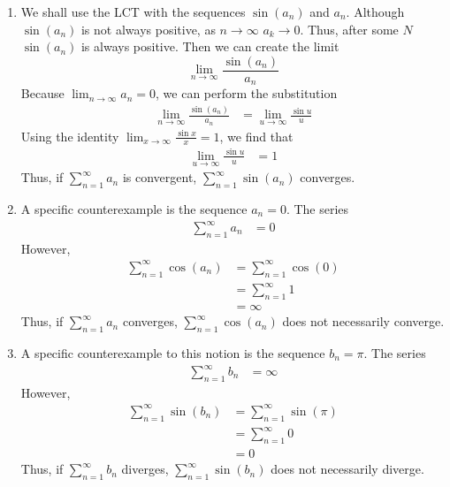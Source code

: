 \documentclass{article}
\begin{document}
\begin{enumerate}[label=\textbf{(11.\arabic*)}]
\begin{enumerate}
    \item We shall use the LCT with the sequences $\sin(a_n)$ and $a_n$. Although $\sin(a_n)$ is not always positive, as $n\to\infty$ $a_k\to0$. Thus, after some $N$ $\sin(a_n)$ is always positive. Then we can create the limit
    \[\lim_{n\to\infty}\frac{\sin(a_n)}{a_n}\]
    Because $\displaystyle \lim_{n\to\infty} a_n=0$, we can perform the substitution
    \begin{align*}
        \lim_{n\to\infty}\frac{\sin(a_n)}{a_n} &= \lim_{u\to\infty} \frac{\sin u}{u}
    \end{align*}
    Using the identity $\displaystyle \lim_{x\to\infty} \frac{\sin x}{x}=1$, we find that
    \begin{align*}
        \lim_{u\to\infty} \frac{\sin u}{u} &= 1
    \end{align*}
    Thus, if $\displaystyle \sum_{n=1}^\infty a_n$ is convergent, $\displaystyle \sum_{n=1}^\infty \sin(a_n)$ converges.
    \item A specific counterexample is the sequence $a_n=0$. The series 
    \begin{align*}
        \sum_{n=1}^\infty a_n &= 0
    \end{align*}
    However, 
    \begin{align*}
        \sum_{n=1}^\infty \cos(a_n) &= \sum_{n=1}^\infty \cos(0)\\
        &= \sum_{n=1}^\infty 1\\
        &= \infty
    \end{align*}
    Thus, if $\displaystyle \sum_{n=1}^\infty a_n$ converges, $\displaystyle \sum_{n=1}^\infty \cos(a_n)$ does not necessarily converge.
    \item A specific counterexample to this notion is the sequence $b_n=\pi$. The series
    \begin{align*}
        \sum_{n=1}^\infty b_n &= \infty
    \end{align*}
    However,
    \begin{align*}
        \sum_{n=1}^\infty \sin(b_n) &= \sum_{n=1}^\infty \sin(\pi)\\
        &= \sum_{n=1}^\infty 0\\
        &= 0
    \end{align*}
    Thus, if $\displaystyle \sum_{n=1}^\infty b_n$ diverges, $\displaystyle \sum_{n=1}^\infty \sin(b_n)$ does not necessarily diverge.
\end{enumerate}

\end{enumerate}
\end{document}
